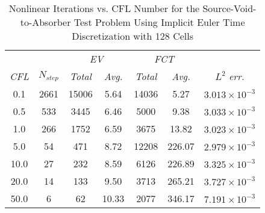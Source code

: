 \begin{table}[htb]
\caption{Nonlinear Iterations vs. CFL Number for the
 Source-Void-to-Absorber Test Problem Using Implicit Euler Time Discretization
 with 128 Cells}
\label{tab:source_void_to_absorber_be_iterations_cfl}
\centering
\begin{tabular}{c c c c c c c }\toprule
 & & \multicolumn{2}{c}{\emph{EV}}
  & \multicolumn{2}{c}{\emph{FCT}} &\\
\emph{CFL} & $N_{step}$ & \emph{Total} & \emph{Avg.}
  & \emph{Total} & \emph{Avg.} & $L^2$ \emph{err.}\\\midrule
0.1 & 2661 & 15006 &  5.64 & 14036 &   5.27 & $3.013\times10^{-3}$\\
0.5 &  533 &  3445 &  6.46 &  5000 &   9.38 & $3.033\times10^{-3}$\\
1.0 &  266 &  1752 &  6.59 &  3675 &  13.82 & $3.023\times10^{-3}$\\
5.0 &   54 &   471 &  8.72 & 12208 & 226.07 & $2.979\times10^{-3}$\\
10.0 &  27 &   232 &  8.59 &  6126 & 226.89 & $3.325\times10^{-3}$\\
20.0 &  14 &   133 &  9.50 &  3713 & 265.21 & $3.727\times10^{-3}$\\
50.0 &   6 &    62 & 10.33 &  2077 & 346.17 & $7.191\times10^{-3}$\\
\bottomrule\end{tabular}
\end{table}

\clearpage
